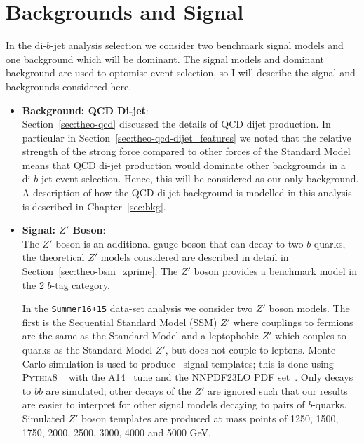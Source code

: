 \section{Backgrounds and Signal}
\label{sec:evt-s+b}

In the di-$b$-jet analysis selection we consider two
benchmark signal models and one background which will be dominant.
The signal models and dominant background are
used to optomise event selection, so I will describe
the signal and backgrounds considered here.

\begin{itemize}[leftmargin=*]
\item\textbf{Background: QCD Di-jet}: \\
  Section~\ref{sec:theo-qcd} discussed the details of QCD dijet production.
  In particular in Section~\ref{sec:theo-qcd-dijet_features} we noted that the
  relative strength of the strong force compared to other forces
  of the Standard Model means that
  QCD di-jet production would dominate other backgrounds in a di-$b$-jet event selection.
  Hence, this will be considered as our only background.
  A description of how the QCD di-jet background is modelled in this analysis is described in Chapter~\ref{sec:bkg}.\\

\item\textbf{Signal: $Z'$ Boson}: \\
  The $Z'$ boson is an additional gauge boson that can decay to two $b$-quarks,
  the theoretical $Z'$ models considered are
  described in detail in Section~\ref{sec:theo-bsm_zprime}.
  The $Z'$ boson provides a benchmark model in the 2 $b$-tag category.

  In the \verb|Summer16+15| data-set analysis we consider two $Z'$ boson models.
  The first is the Sequential Standard Model (SSM) $Z'$ where couplings to fermions
  are the same as the Standard Model and a leptophobic $Z'$ which couples to quarks
  as the Standard Model $Z'$, but does not couple to leptons.
  Monte-Carlo simulation is used to produce \mjj~signal templates;
  this is done using \textsc{Pythia8} ~\cite{dibjet-pythia8} with the A14~\cite{dibjet-a14} tune and the NNPDF23LO PDF set~\cite{dibjet-nnpdf}.
  Only decays to $b\bar{b}$ are simulated;
  other decays of the  $Z'$  are ignored such that our
  results are easier to interpret for other signal models decaying to pairs of $b$-quarks.
  Simulated $Z'$ boson templates are produced at mass points of
  1250, 1500, 1750, 2000, 2500, 3000, 4000 and 5000 GeV.
  

\end{itemize}
